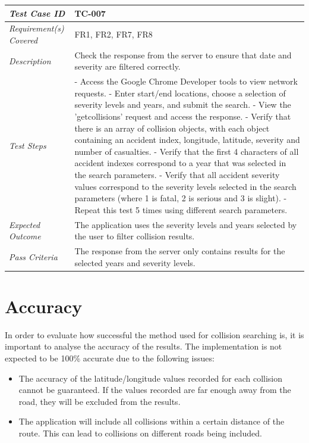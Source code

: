 \documentclass[authoryearcitations]{UoYCSproject}
\begin{document}
\begin{tabular}{| p{2.5cm} | p{11cm} |}
	\hline
	\textit{Test Case ID} & TC-007 \\ \hline
	\textit{Requirement(s) Covered} & FR1, FR2, FR7, FR8 \\ \hline
	\textit{Description} & Check the response from the server to ensure that date and severity are filtered correctly. \\ \hline
	\textit{Test Steps}& - Access the Google Chrome Developer tools to view network requests. 
	\newline - Enter start/end locations, choose a selection of severity levels and years, and submit the search.
	\newline - View the 'getcollisions' request and access the response.
	\newline - Verify that there is an array of collision objects, with each object containing an accident index, longitude, latitude, severity and number of casualties.
	\newline - Verify that the first 4 characters of all accident indexes correspond to a year that was selected in the search parameters.
	\newline - Verify that all accident severity values correspond to the severity levels selected in the search parameters (where 1 is fatal, 2 is serious and 3 is slight).
	\newline - Repeat this test 5 times using different search parameters.
 \\ \hline
	\textit{Expected Outcome} & The application uses the severity levels and years selected by the user to filter collision results.  \\ \hline
	\textit{Pass Criteria} & The response from the server only contains results for the selected years and severity levels. \\ \hline
\end{tabular}

\section{Accuracy}
\label{sec:searchAnalysis}

In order to evaluate how successful the method used for collision searching is, it is important to analyse the accuracy of the results. The implementation is not expected to be 100\% accurate due to the following issues:

\begin{itemize}
	\item The accuracy of the latitude/longitude values recorded for each collision cannot be guaranteed. If the values recorded are far enough away from the road, they will be excluded from the results.
	\item The application will include all collisions within a certain distance of the route. This can lead to collisions on different roads being included.
\end{itemize}
\end{document}
